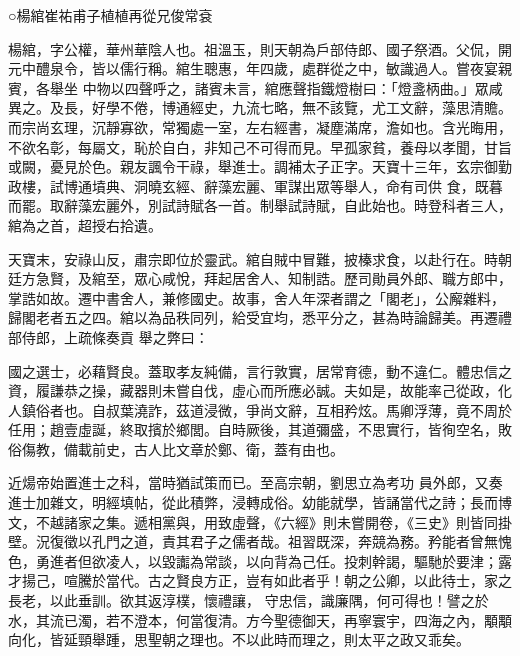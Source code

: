 
\begin{pinyinscope}

 ○楊綰崔祐甫子植植再從兄俊常袞



 楊綰，字公權，華州華陰人也。祖溫玉，則天朝為戶部侍郎、國子祭酒。父侃，開元中醴泉令，皆以儒行稱。綰生聰惠，年四歲，處群從之中，敏識過人。嘗夜宴親賓，各舉坐
 中物以四聲呼之，諸賓未言，綰應聲指鐵燈樹曰：「燈盞柄曲。」眾咸異之。及長，好學不倦，博通經史，九流七略，無不該覽，尤工文辭，藻思清贍。而宗尚玄理，沉靜寡欲，常獨處一室，左右經書，凝塵滿席，澹如也。含光晦用，不欲名彰，每屬文，恥於自白，非知己不可得而見。早孤家貧，養母以孝聞，甘旨或闕，憂見於色。親友諷令干祿，舉進士。調補太子正字。天寶十三年，玄宗御勤政樓，試博通墳典、洞曉玄經、辭藻宏麗、軍謀出眾等舉人，命有司供
 食，既暮而罷。取辭藻宏麗外，別試詩賦各一首。制舉試詩賦，自此始也。時登科者三人，綰為之首，超授右拾遺。



 天寶末，安祿山反，肅宗即位於靈武。綰自賊中冒難，披榛求食，以赴行在。時朝廷方急賢，及綰至，眾心咸悅，拜起居舍人、知制誥。歷司勛員外郎、職方郎中，掌誥如故。遷中書舍人，兼修國史。故事，舍人年深者謂之「閣老」，公廨雜料，歸閣老者五之四。綰以為品秩同列，給受宜均，悉平分之，甚為時論歸美。再遷禮部侍郎，上疏條奏貢
 舉之弊曰：



 國之選士，必藉賢良。蓋取孝友純備，言行敦實，居常育德，動不違仁。體忠信之資，履謙恭之操，藏器則未嘗自伐，虛心而所應必誠。夫如是，故能率己從政，化人鎮俗者也。自叔葉澆詐，茲道浸微，爭尚文辭，互相矜炫。馬卿浮薄，竟不周於任用；趙壹虛誕，終取擯於鄉閭。自時厥後，其道彌盛，不思實行，皆徇空名，敗俗傷教，備載前史，古人比文章於鄭、衛，蓋有由也。



 近煬帝始置進士之科，當時猶試策而已。至高宗朝，劉思立為考功
 員外郎，又奏進士加雜文，明經填帖，從此積弊，浸轉成俗。幼能就學，皆誦當代之詩；長而博文，不越諸家之集。遞相黨與，用致虛聲，《六經》則未嘗開卷，《三史》則皆同掛壁。況復徵以孔門之道，責其君子之儒者哉。祖習既深，奔競為務。矜能者曾無愧色，勇進者但欲凌人，以毀讟為常談，以向背為己任。投刺幹謁，驅馳於要津；露才揚己，喧騰於當代。古之賢良方正，豈有如此者乎！朝之公卿，以此待士，家之長老，以此垂訓。欲其返淳樸，懷禮讓，
 守忠信，識廉隅，何可得也！譬之於水，其流已濁，若不澄本，何當復清。方今聖德御天，再寧寰宇，四海之內，顒顒向化，皆延頸舉踵，思聖朝之理也。不以此時而理之，則太平之政又乖矣。




\end{pinyinscope}
